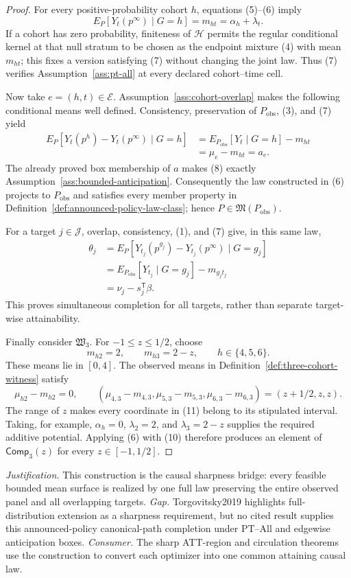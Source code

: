 \documentclass{article}
\begin{document}
\begin{proof}
For every positive-probability cohort \(h\), equations (5)--(6) imply
\[
 E_P[Y_t(p^\infty)\mid G=h]=m_{ht}=\alpha_h+\lambda_t.
\tag{7}
\]
If a cohort has zero probability, finiteness of \(\mathcal H\) permits the regular conditional kernel at that null stratum to be chosen as the endpoint mixture (4) with mean \(m_{ht}\); this fixes a version satisfying (7) without changing the joint law.  Thus (7) verifies Assumption~\ref{ass:pt-all} at every declared cohort--time cell.

Now take \(e=(h,t)\in\mathcal E\).  Assumption~\ref{ass:cohort-overlap} makes the following conditional means well defined.  Consistency, preservation of \(P_{\mathrm{obs}}\), (3), and (7) yield
\[
 \begin{aligned}
 E_P[Y_t(p^h)-Y_t(p^\infty)\mid G=h]
 &=E_{P_{\mathrm{obs}}}[Y_t\mid G=h]-m_{ht}\\
 &=\mu_e-m_{ht}=a_e.
 \end{aligned}
\tag{8}
\]
The already proved box membership of \(a\) makes (8) exactly Assumption~\ref{ass:bounded-anticipation}.  Consequently the law constructed in (6) projects to \(P_{\mathrm{obs}}\) and satisfies every member property in Definition~\ref{def:announced-policy-law-class}; hence \(P\in\mathfrak M(P_{\mathrm{obs}})\).

For a target \(j\in\mathcal J\), overlap, consistency, (1), and (7) give, in this same law,
\[
 \begin{aligned}
 \theta_j
 &=E_P[Y_{t_j}(p^{g_j})-Y_{t_j}(p^\infty)\mid G=g_j]\\
 &=E_{P_{\mathrm{obs}}}[Y_{t_j}\mid G=g_j]-m_{g_jt_j}\\
 &=\nu_j-s_j^{\mathsf T}\beta.
 \end{aligned}
\tag{9}
\]
This proves simultaneous completion for all targets, rather than separate target-wise attainability.

Finally consider \(\mathfrak W_3\).  For \(-1\le z\le1/2\), choose
\[
 m_{h2}=2,
 \qquad m_{h3}=2-z,
 \qquad h\in\{4,5,6\}.
\tag{10}
\]
These means lie in \([0,4]\).  The observed means in Definition~\ref{def:three-cohort-witness} satisfy
\[
 \mu_{h2}-m_{h2}=0,
 \qquad
 (\mu_{4,3}-m_{4,3},\mu_{5,3}-m_{5,3},\mu_{6,3}-m_{6,3})
 =(z+1/2,z,z).
\tag{11}
\]
The range of \(z\) makes every coordinate in (11) belong to its stipulated interval.  Taking, for example, \(\alpha_h=0\), \(\lambda_2=2\), and \(\lambda_3=2-z\) supplies the required additive potential.  Applying (6) with (10) therefore produces an element of \(\mathsf{Comp}_3(z)\) for every \(z\in[-1,1/2]\).
\end{proof}
\par\smallskip\noindent \textit{Justification.} This construction is the causal sharpness bridge: every feasible bounded mean surface is realized by one full law preserving the entire observed panel and all overlapping targets. \textit{Gap.} Torgovitsky2019 highlights full-distribution extension as a sharpness requirement, but no cited result supplies this announced-policy canonical-path completion under PT--All and edgewise anticipation boxes. \textit{Consumer.} The sharp ATT-region and circulation theorems use the construction to convert each optimizer into one common attaining causal law.
\end{document}
